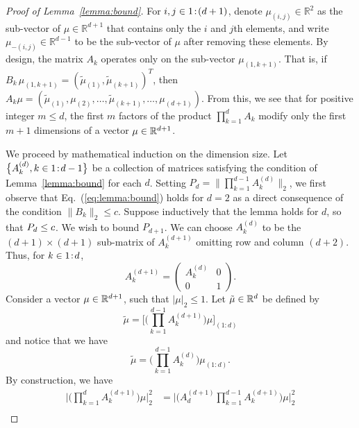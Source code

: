 \begin{proof}[Proof of Lemma~\ref{lemma:bound}]
  For $i, j \in {1}\!:\!{(d+1)}$, denote $\mu_{(i, j)} \in \mathbb{R}^2$ as the sub-vector of $\mu \in \mathbb{R}^{d+1}$ that contains only the $i$ and $j$th elements, and write $\mu_{-(i, j)} \in \mathbb{R}^{d-1}$ to be the sub-vector of $\mu$ after removing these elements.
  By design, the matrix $A_k$ operates only on the sub-vector $\mu_{(1, k+1)}$.
That is, if $B_k \, \mu_{(1, k+1)} = (\tilde{\mu}_{(1)}, \tilde{\mu}_{(k+1)})^T$, then $A_k\mu = (\tilde{\mu}_{(1)}, \mu_{(2)}, \ldots, \tilde{\mu}_{(k + 1)}, \ldots, \mu_{(d+1)})$.
  From this, we see that for positive integer $m \leq d$,
  the first $m$ factors of the product $\prod_{k = 1}^d A_k$ modify only the first $m + 1$ dimensions of a vector $\mu \in \mathbb{R}^{d+1}$.
  
We proceed by mathematical induction on the dimension size.
Let $\big\{A^{(d)}_k, k\in {1}\!:\!{d-1}\big\}$ be a collection of matrices satisfying the condition of Lemma~\ref{lemma:bound} for each $d$.
Setting $P_d=\big\|\prod_{k = 1}^{d-1} A^{(d)}_k \big\|_2$, we first observe that Eq.~(\ref{eq:lemma:bound}) holds for $d=2$ as a direct consequence of the condition $\|B_k\|_2 \leq c$.
Suppose inductively that the lemma holds for $d$, so that $P_d\leq c$.
We wish to bound $P_{d+1}$.
We can choose $A^{(d)}_k$ to be the $(d+1)\times (d+1)$ sub-matrix of $A^{(d+1)}_k$ omitting row and column $(d+2)$.
Thus, for $k\in{1}\!:\!{d}$,
\begin{equation*}
A^{(d+1)}_k =
  \begin{pmatrix}
    A^{(d)}_k & 0 \\
    0 & 1
  \end{pmatrix}.
\end{equation*}
Consider a vector $\mu \in \mathbb{R}^{d+1}$, such that $\vert\mu\vert_2 \leq 1$.
Let $\tilde{\mu} \in \mathbb{R}^{d}$ be defined by 
\begin{equation}
\tilde{\mu} = \bigg[\bigg(\prod_{k = 1}^{d-1} A^{(d+1)}_k\bigg)\mu\bigg]_{(1:d)}
\end{equation}
and notice that we have
\begin{equation}\label{eq:lemma:d}
\tilde{\mu} = \bigg(\prod_{k = 1}^{d-1} A^{(d)}_k\bigg)\mu_{(1:d)}.
\end{equation}
By construction, we have 
\begin{align*}
    \bigg\vert\Big(\prod_{k = 1}^d A^{(d+1)}_k\Big)\mu \bigg\vert^2_2 &= \bigg\vert\Big(A^{(d+1)}_d\prod_{k = 1}^{d-1} A^{(d+1)}_k\Big)\mu \bigg\vert^2_2\\

\end{align*}
\end{proof}
